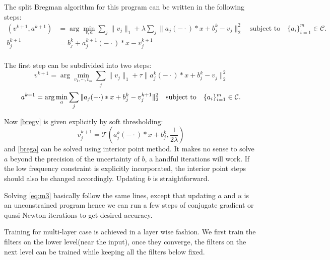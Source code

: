 \documentclass[a4paper]{article}
\begin{document}
The split Bregman algorithm for this program can be written in the following steps:
\begin{equation}
\label{breg:all}
\begin{aligned}
	(v^{k+1},a^{k+1}) &=\arg\min_{v,a} \sum_j \|v_j\|_1 + \lambda\sum_j\|a_j(-\cdot)*x+b_j^k-v_j\|_2^2 \quad\textrm{subject to} \quad \{a_i\}_{i=1}^m \in \mathcal{C}.\\
	b_j^{k+1} &= b_j^k + a_j^{k+1}(-\cdot)*x - v_j^{k+1} \\
\end{aligned}
\end{equation}

The first step can be subdivided into two steps:
\begin{equation}
\label{bregv}
		v^{k+1}  = \arg\min_{v_1,\cdots,v_m}  \sum_j \|v_j\|_1 + \tau \|a^k_j(-\cdot)*x +b^k_j -v_j\|_2^2
\end{equation}
\begin{equation}
\label{brega}
a^{k+1} =\arg\min_a \sum_j \|a_j(-\cdot)*x+b^{k}_j-v^{k+1}_j\|_2^2   \quad\textrm{subject to} \quad \{a_i\}_{i=1}^m \in \mathcal{C}.\\
\end{equation}

Now \eqref{bregv} is given explicitly by soft thresholding:
\begin{equation}
	v^{k+1}_j = \mathcal{T}(a^k_j(-\cdot)*x+b^k_j,\frac{1}{2\lambda})
\end{equation}
and \eqref{brega} can be solved using interior point method. It makes no sense to solve $a$ beyond the precision of the uncertainty of $b$, a handful iterations will work. If the low frequency constraint is explicitly incorporated, the interior point steps should also be changed accordingly. Updating $b$ is straightforward.

Solving \eqref{eq:m3} basically follow the same lines, except that updating $a$ and $u$ is an unconstrained program hence we can run a few steps of conjugate gradient or quasi-Newton iterations to get desired accuracy.

Training for multi-layer case is achieved in a layer wise fashion. We first train the filters on the lower level(near the input), once they converge, the filters on the next level can be trained while keeping all the filters below fixed.










\end{document}

